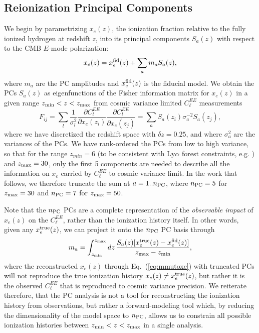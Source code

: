 \documentclass[prd,twocolumn,amsmath,amssymb,floatfix,superscriptaddress,nofootinbib]{revtex4-1}
\newcommand{\xef}{x_e^{\rm fid}}
\newcommand{\zmax}{z_{\rm max}}
\newcommand{\zmin}{z_{\rm min}}
\newcommand{\beq}{\begin{equation}}
\newcommand{\eeq}{\end{equation}}
\begin{document}
\subsection{Reionization Principal Components}
\label{sec:PC}

We begin by parametrizing $x_e(z)$, the ionization fraction relative to the fully ionized hydrogen at redshift $z$, into its principal components $S_{a}(z)$ with respect to the CMB $E$-mode polarization:
%
\begin{equation}
x_e(z)=\xef(z)+\sum_{a}m_{a}S_{a}(z),
\label{eq:mmutoxe}
\end{equation}
%
where $m_a$ are the PC amplitudes and $\xef(z)$ is the fiducial model. We obtain the PCs $S_{a}(z)$ as eigenfunctions of the Fisher information matrix for $x_e(z)$ in a given range $z_{\rm min}<z<z_{\rm max}$ from cosmic variance limited $C_\ell^{EE}$ measurements 
%
\beq
F_{ij} = \sum_l \frac{1}{\sigma_l^2} \frac{\partial C_l^{EE}}{\partial x_e(z_i)}\frac{\partial C_l^{EE}}{\partial x_e(z_j)} = \sum_a S_a(z_i) \sigma_a^{-2} S_a(z_j),
\eeq
%
where we have discretized the redshift space with $\delta z= 0.25$, and where $\sigma_a^2$ are the variances of the PCs. We have rank-ordered the PCs from low to high variance, so that for the range $z_{min} = 6$ (to be consistent with Ly$\alpha$ forest constraints, e.g. \cite{Becker:2015lua}) and $z_{\rm max} = 30$, only the first 5 components are needed to describe all the information on $x_e$ carried by $C_\ell^{EE}$ to cosmic variance limit. In the work that follows, we therefore truncate the sum at $a = 1 .. n_{\rm{PC}}$, where $n_{\rm{PC}} = 5$ for $z_{\rm max} = 30$ and $n_{\rm{PC}} = 7$ for $z_{\rm max} = 50$.

Note that the $n_{\rm PC}$ PCs are a complete representation of the \textit{observable impact} of $x_e(z)$ on the $C_\ell^{EE}$, rather than the ionization history itself. In other words, 
given any $x_e^{\rm true}(z)$, we can project it onto the $n_{\rm PC}$ PC basis through
\begin{equation}
m_{a}=
  \int _{\zmin}^{\zmax} dz\, \frac{S_{a}(z) [x_e^{\rm true}(z)-\xef(z)]}{\zmax-\zmin},
\label{eq:xetommu}
\end{equation}
%
where the reconstructed $x_e(z)$ through Eq.~(\ref{eq:mmutoxe}) with truncated PCs will not reproduce the true ionization history $x_e(z) \neq x_e^{\rm true}(z)$, but rather it is the observed $C_\ell^{EE}$ that is reproduced to cosmic variance precision. We reiterate therefore, that the PC analysis is not a tool for reconstructing the ionization history from observations, but rather a forward-modeling tool which, by reducing the dimensionality of the model space to $n_{\rm PC}$, allows us to constrain all possible ionization histories between $z_{\rm min}<z<z_{\rm max}$ in a single analysis.
\end{document}
